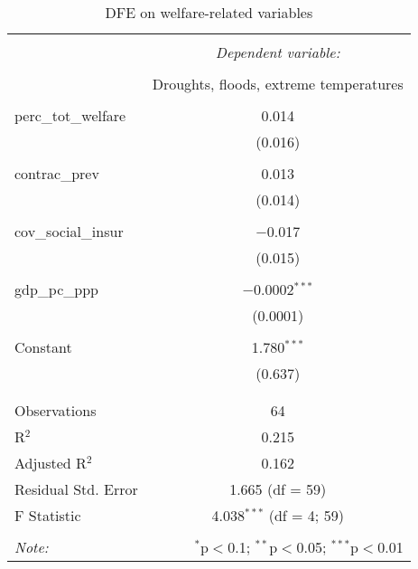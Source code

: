 
\begin{table}[!htbp] \centering 
  \caption{DFE on welfare-related variables} 
  \label{} 
\begin{tabular}{@{\extracolsep{5pt}}lc} 
\\[-1.8ex]\hline 
\hline \\[-1.8ex] 
 & \multicolumn{1}{c}{\textit{Dependent variable:}} \\ 
\cline{2-2} 
\\[-1.8ex] & Droughts, floods, extreme temperatures \\ 
\hline \\[-1.8ex] 
 perc\_tot\_welfare & 0.014 \\ 
  & (0.016) \\ 
  & \\ 
 contrac\_prev & 0.013 \\ 
  & (0.014) \\ 
  & \\ 
 cov\_social\_insur & $-$0.017 \\ 
  & (0.015) \\ 
  & \\ 
 gdp\_pc\_ppp & $-$0.0002$^{***}$ \\ 
  & (0.0001) \\ 
  & \\ 
 Constant & 1.780$^{***}$ \\ 
  & (0.637) \\ 
  & \\ 
\hline \\[-1.8ex] 
Observations & 64 \\ 
R$^{2}$ & 0.215 \\ 
Adjusted R$^{2}$ & 0.162 \\ 
Residual Std. Error & 1.665 (df = 59) \\ 
F Statistic & 4.038$^{***}$ (df = 4; 59) \\ 
\hline 
\hline \\[-1.8ex] 
\textit{Note:}  & \multicolumn{1}{r}{$^{*}$p$<$0.1; $^{**}$p$<$0.05; $^{***}$p$<$0.01} \\ 
\end{tabular} 
\end{table} 
